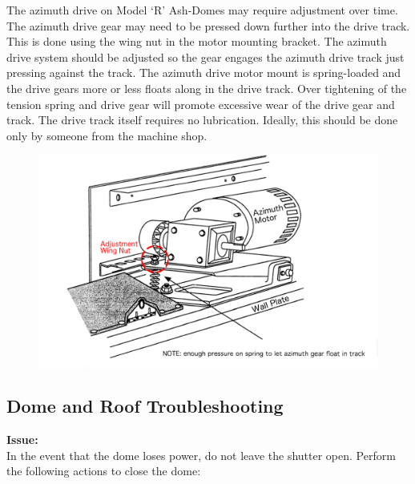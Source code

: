 \documentclass[12pt,titlepage]{article}
\begin{document}
The azimuth drive on Model ‘R’ Ash-Domes may require adjustment over time.
The azimuth drive gear may need to be pressed down further into the drive track.
This is done using the wing nut in the motor mounting bracket.
The azimuth drive system should be adjusted so the gear engages the azimuth drive track just pressing against the track.
The azimuth drive motor mount is spring-loaded and the drive gears more or less floats along in the drive track.
Over tightening of the tension spring and drive gear will promote excessive wear of the drive gear and track.
The drive track itself requires no lubrication.
Ideally, this should be done only by someone from the machine shop.
\begin{figure}[H] 
	\begin{center}
		\includegraphics[width=.8\textwidth]{./images/dome/azimuth_motor_wide.png} 
		\label{azimuth_motor}
	\end{center}
\end{figure}

\subsection{Dome and Roof Troubleshooting}\label{ssec:dome_trouble}
\noindent\textbf{Issue:}\\
In the event that the dome loses power, do not leave the shutter open. Perform the following actions to close the dome:
\end{document}

